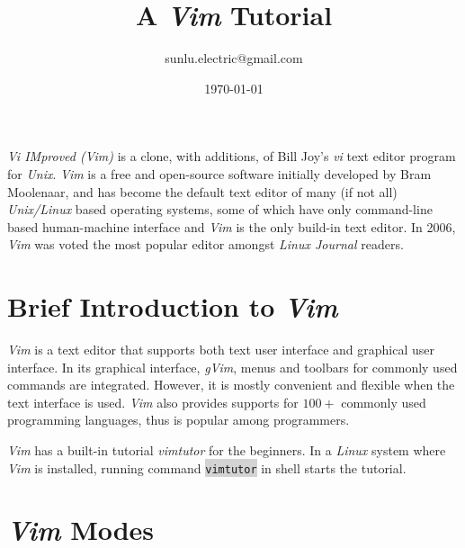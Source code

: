 \documentclass[a4paper]{article}
\title{A \textit{Vim} Tutorial}
\author{sunlu.electric@gmail.com}
\date{\today}
\begin{document}
\maketitle

\textit{Vi IMproved (Vim)} is a clone, with additions, of Bill Joy's \textit{vi} text editor program for \textit{Unix}. \textit{Vim} is a free and open-source software initially developed by Bram Moolenaar, and has become the default text editor of many (if not all) \textit{Unix/Linux} based operating systems, some of which have only command-line based human-machine interface and \textit{Vim} is the only build-in text editor. In 2006, \textit{Vim} was voted the most popular editor amongst \textit{Linux Journal} readers.

\section{Brief Introduction to \textit{Vim}}

\textit{Vim} is a text editor that supports both text user interface and graphical user interface. In its graphical interface, \textit{gVim}, menus and toolbars for commonly used commands are integrated. However, it is mostly convenient and flexible when the text interface is used. \textit{Vim} also provides supports for $100+$ commonly used programming languages, thus is popular among programmers.

\textit{Vim} has a built-in tutorial \textit{vimtutor} for the beginners. In a \textit{Linux} system where \textit{Vim} is installed, running command \colorbox{lightgray}{\texttt{vimtutor}} in shell starts the tutorial.

\section{\textit{Vim} Modes}
\end{document}
